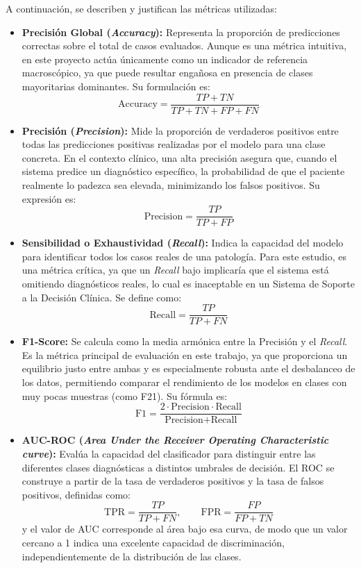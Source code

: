 \documentclass[12pt,a4paper,onecolumn,oneside]{report}
\begin{document}
A continuación, se describen y justifican las métricas utilizadas:

\begin{itemize}
    \item \textbf{Precisión Global (\textit{Accuracy}):} Representa la proporción de predicciones correctas sobre el total de casos evaluados. Aunque es una métrica intuitiva, en este proyecto actúa únicamente como un indicador de referencia macroscópico, ya que puede resultar engañosa en presencia de clases mayoritarias dominantes. Su formulación es:
    \[
    \text{Accuracy} = \frac{TP + TN}{TP + TN + FP + FN}
    \]
    \item \textbf{Precisión (\textit{Precision}):} Mide la proporción de verdaderos positivos entre todas las predicciones positivas realizadas por el modelo para una clase concreta. En el contexto clínico, una alta precisión asegura que, cuando el sistema predice un diagnóstico específico, la probabilidad de que el paciente realmente lo padezca sea elevada, minimizando los falsos positivos. Su expresión es:
    \[
    \text{Precision} = \frac{TP}{TP + FP}
    \]
    \item \textbf{Sensibilidad o Exhaustividad (\textit{Recall}):} Indica la capacidad del modelo para identificar todos los casos reales de una patología. Para este estudio, es una métrica crítica, ya que un \textit{Recall} bajo implicaría que el sistema está omitiendo diagnósticos reales, lo cual es inaceptable en un Sistema de Soporte a la Decisión Clínica. Se define como:
    \[
    \text{Recall} = \frac{TP}{TP + FN}
    \]
    \item \textbf{F1-Score:} Se calcula como la media armónica entre la Precisión y el \textit{Recall}. Es la métrica principal de evaluación en este trabajo, ya que proporciona un equilibrio justo entre ambas y es especialmente robusta ante el desbalanceo de los datos, permitiendo comparar el rendimiento de los modelos en clases con muy pocas muestras (como F21). Su fórmula es:
    \[
    \text{F1} = \frac{2 \cdot \text{Precision} \cdot \text{Recall}}{\text{Precision} + \text{Recall}}
    \]
    \item \textbf{AUC-ROC (\textit{Area Under the Receiver Operating Characteristic curve}):} Evalúa la capacidad del clasificador para distinguir entre las diferentes clases diagnósticas a distintos umbrales de decisión. El ROC se construye a partir de la tasa de verdaderos positivos y la tasa de falsos positivos, definidas como:
    \[
    \text{TPR} = \frac{TP}{TP + FN}, \qquad \text{FPR} = \frac{FP}{FP + TN}
    \]
    y el valor de AUC corresponde al área bajo esa curva, de modo que un valor cercano a 1 indica una excelente capacidad de discriminación, independientemente de la distribución de las clases.
\end{itemize}
\end{document}
